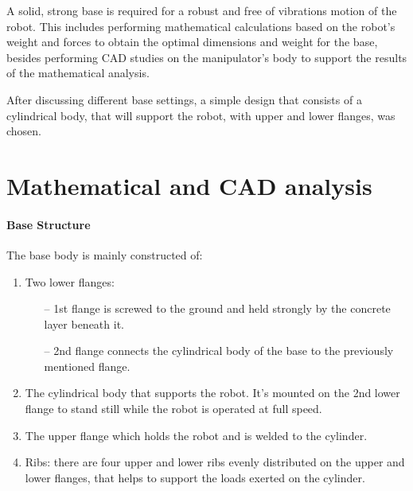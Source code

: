 
%
A solid, strong base is required for a robust and free of vibrations motion of the robot. This includes performing mathematical calculations based on the robot’s weight and forces to obtain the optimal dimensions and weight for the base, besides performing CAD studies on the manipulator’s body to support the results of the mathematical analysis. 

After discussing different base settings, a simple design that consists of a cylindrical body, that will support the robot, with upper and lower flanges, was chosen.

		
\section{Mathematical and CAD analysis}

\paragraph{Base Structure}
The base body is mainly constructed of:
\begin{enumerate}
\item Two lower flanges:
	\begin{itemize}
	\item[--] 1st flange is screwed to the ground and held strongly by the concrete layer beneath it.
	\item[--] 2nd flange connects the cylindrical body of the base to the previously mentioned flange.
	\end{itemize}

\item The cylindrical body that supports the robot. It’s mounted on the 2nd lower flange to stand still while the robot is operated at full speed.

\item The upper flange which holds the robot and is welded to the cylinder.

\item Ribs: there are four upper and lower ribs evenly distributed on the upper and lower flanges, that helps to support the loads exerted on the cylinder.
\end{enumerate}

